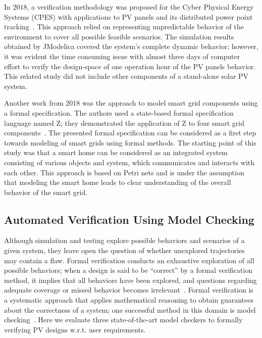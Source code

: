 \documentclass[review]{elsarticle}
\begin{document}
In $2018$, a verification methodology was proposed for the Cyber Physical Energy Systems (CPES) with applications to PV panels and its distributed power point tracking~\cite{Driouich2018}. This approach relied on representing unpredictable behavior of the environment to cover all possible feasible scenarios. The simulation results obtained by JModelica covered the system's complete dynamic behavior; however, it was evident the time consuming issue with almost three days of computer effort to verify the design-space of one operation hour of the PV panels behavior. This related study did not include other components of a stand-alone solar PV system.

Another work from $2018$ was the approach to model smart grid components using a formal specification. The authors used a state-based formal specification language named Z; they demonstrated the application of Z to four smart grid components~\cite{Akram2018}. The presented formal specification can be considered as a first step towards modeling of smart grids using formal methods. The starting point of this study was that a smart home can be considered as an integrated system consisting of various objects and system, which communicates and interacts with each other. This approach is based on Petri nets and is under the assumption that modeling the smart home leads to clear understanding of the overall behavior of the smart grid.

\subsection{Automated Verification Using Model Checking}
\label{sec:AutomatedVerification}

Although simulation and testing explore possible behaviors and scenarios of a given system, 
they leave open the question of whether unexplored trajectories may contain a flaw. 
Formal verification conducts an exhaustive exploration of all possible behaviors; 
when a design is said to be ``correct'' by a formal verification method, it implies that all 
behaviors have been explored, and questions regarding adequate coverage or missed behavior 
becomes irrelevant~\cite{Clarke2012}. Formal verification is a systematic approach that 
applies mathematical reasoning to obtain guarantees about the correctness of a system; 
one successful method in this domain is model checking~\cite{Clarke2012}. 
Here we evaluate three state-of-the-art model checkers to formally verifying PV designs w.r.t. user requirements.
\end{document}
